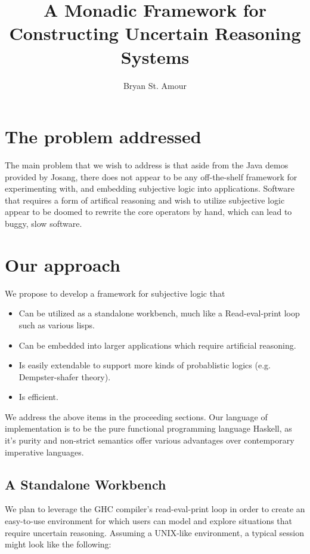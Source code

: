 \documentclass[a4paper]{article}
\title{A Monadic Framework for Constructing Uncertain Reasoning Systems}
\author{Bryan St. Amour}
\begin{document}
\maketitle

\section{The problem addressed}

\par
The main problem that we wish to address is that aside from the Java demos provided
by Josang, there does not appear to be any off-the-shelf framework for experimenting
with, and embedding subjective logic into applications. Software that requires a form
of artifical reasoning and wish to utilize subjective logic appear to be doomed to
rewrite the core operators by hand, which can lead to buggy, slow software.

\section{Our approach}

\par
We propose to develop a framework for subjective logic that

\begin{itemize}
	\item Can be utilized as a standalone workbench, much like a Read-eval-print loop such as various lisps.
	\item Can be embedded into larger applications which require artificial reasoning.
	\item Is easily extendable to support more kinds of probablistic logics (e.g. Dempster-shafer theory).
	\item Is efficient.
\end{itemize}

\par
We address the above items in the proceeding sections.
Our language of implementation is to be the pure functional programming language Haskell, as it's purity
and non-strict semantics offer various advantages over contemporary imperative languages.

\subsection{A Standalone Workbench}

\par
We plan to leverage the GHC compiler's read-eval-print loop in order to create an easy-to-use environment
for which users can model and explore situations that require uncertain reasoning. Assuming a UNIX-like
environment, a typical session might look like the following:
\end{document}

